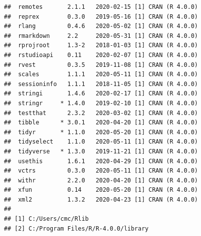 \documentclass[
  12pt,
]{krantz}
\begin{document}
\begin{verbatim}
##  remotes       2.1.1   2020-02-15 [1] CRAN (R 4.0.0)                   
##  reprex        0.3.0   2019-05-16 [1] CRAN (R 4.0.0)                   
##  rlang         0.4.6   2020-05-02 [1] CRAN (R 4.0.0)                   
##  rmarkdown     2.2     2020-05-31 [1] CRAN (R 4.0.0)                   
##  rprojroot     1.3-2   2018-01-03 [1] CRAN (R 4.0.0)                   
##  rstudioapi    0.11    2020-02-07 [1] CRAN (R 4.0.0)                   
##  rvest         0.3.5   2019-11-08 [1] CRAN (R 4.0.0)                   
##  scales        1.1.1   2020-05-11 [1] CRAN (R 4.0.0)                   
##  sessioninfo   1.1.1   2018-11-05 [1] CRAN (R 4.0.0)                   
##  stringi       1.4.6   2020-02-17 [1] CRAN (R 4.0.0)                   
##  stringr     * 1.4.0   2019-02-10 [1] CRAN (R 4.0.0)                   
##  testthat      2.3.2   2020-03-02 [1] CRAN (R 4.0.0)                   
##  tibble      * 3.0.1   2020-04-20 [1] CRAN (R 4.0.0)                   
##  tidyr       * 1.1.0   2020-05-20 [1] CRAN (R 4.0.0)                   
##  tidyselect    1.1.0   2020-05-11 [1] CRAN (R 4.0.0)                   
##  tidyverse   * 1.3.0   2019-11-21 [1] CRAN (R 4.0.0)                   
##  usethis       1.6.1   2020-04-29 [1] CRAN (R 4.0.0)                   
##  vctrs         0.3.0   2020-05-11 [1] CRAN (R 4.0.0)                   
##  withr         2.2.0   2020-04-20 [1] CRAN (R 4.0.0)                   
##  xfun          0.14    2020-05-20 [1] CRAN (R 4.0.0)                   
##  xml2          1.3.2   2020-04-23 [1] CRAN (R 4.0.0)                   
## 
## [1] C:/Users/cmc/Rlib
## [2] C:/Program Files/R/R-4.0.0/library
\end{verbatim}
\end{document}

